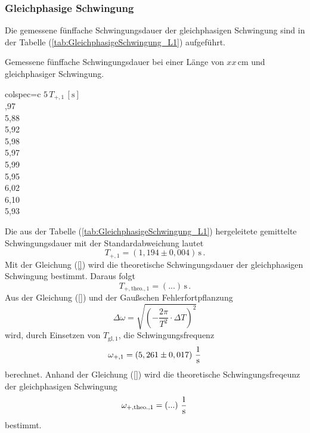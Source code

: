 \subsubsection{Gleichphasige Schwingung}
\label{sec:GleichphasigeSchwingung_KuresPendel}
Die gemessene fünffache Schwingungsdauer der gleichphasigen Schwingung sind in der Tabelle (\ref{tab:GleichphasigeSchwingung_L1}) aufgeführt.
\begin{table}[H]
  \centering
  \caption{Gemessene fünffache Schwingungsdauer bei einer Länge von $xx\, \unit{\centi\meter}$ und gleichphasiger Schwingung.}
  \label{tab:GleichphasigeSchwingung_L1}
  \begin{tblr}{colspec={c}}
      \toprule
      $5\, T_{+, 1}\,\left[\unit{\second}\right]$\\
      ,97 \\
      5,88 \\
      5,92 \\
      5,98 \\
      5,97 \\
      5,99 \\
      5,95 \\
      6,02 \\
      6,10 \\
      5,93 \\
      \bottomrule
  \end{tblr}
\end{table}
Die aus der Tabelle (\ref{tab:GleichphasigeSchwingung_L1}) hergeleitete gemittelte Schwingungsdauer mit der Standardabweichung lautet
$$T_{+, 1} = \left( 1,194 \pm 0,004 \right)\,\unit{\second}\,.$$
Mit der Gleichung (\ref{}) wird die theoretische Schwingungsdauer der gleichphasigen Schwingung bestimmt. Daraus folgt
$$T_{+, \text{theo.}, 1} = \left(...\right)\,\unit{\second}\,.$$
Aus der Gleichung (\ref{}) und der Gaußschen Fehlerfortpflanzung 
$$\Delta \omega = \sqrt{\left(-\frac{2 \pi}{T^{2}}\cdot \Delta T \right)^{2}}$$
wird, durch Einsetzen von $T_{\text{gl}, 1}$, die Schwingungsfrequenz
$$\omega_{+, 1} =  \left( 5,261 \pm 0,017 \right)\,\unit[per-mode=fraction]{\per \second}$$ berechnet. 
Anhand der Gleichung (\ref{}) wird die theoretische Schwingungsfreqeunz der gleichphasigen Schwingung 
$$\omega_{+, \text{theo.}, 1} = \left(...\right)\,\unit[per-mode=fraction]{\per \second}\,$$ bestimmt.
%
%
